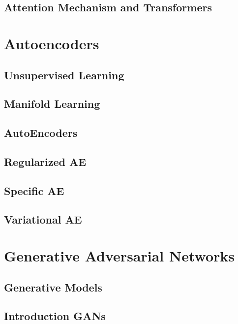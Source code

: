 \documentclass[13pt,compress]{beamer}
\begin{document}
\subsection{Attention Mechanism and Transformers} 
 
\section{Autoencoders}
\subsection{Unsupervised Learning}
 
\subsection{Manifold Learning}
 
\subsection{AutoEncoders}
 
\subsection{Regularized AE} 
 
\subsection{Specific AE} 
 
\subsection{Variational AE}
 
\section{Generative Adversarial Networks}
\subsection{Generative Models}
 
\subsection{Introduction GANs}
 
\end{document}
